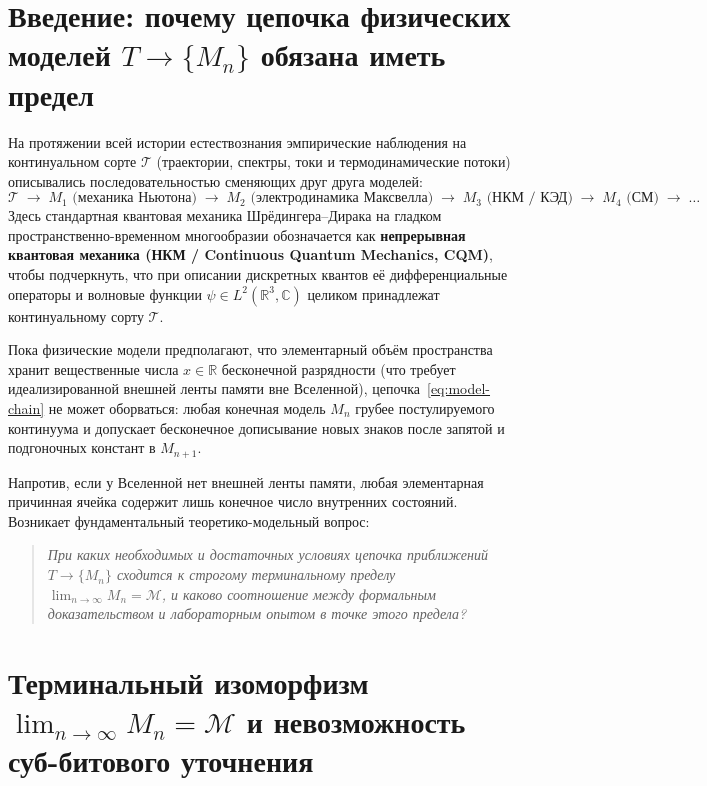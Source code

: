 \documentclass[11pt,a4paper]{article}
\theoremstyle{definition}
\theoremstyle{remark}
\begin{document}
\section{Введение: почему цепочка физических моделей $T \to \{M_n\}$ обязана иметь предел}
\label{sec:intro}

На протяжении всей истории естествознания эмпирические наблюдения на континуальном сорте $\mathcal{T}$ (траектории, спектры, токи и термодинамические потоки) описывались последовательностью сменяющих друг друга моделей:
\begin{equation}
  \label{eq:model-chain}
  \mathcal{T} \;\longrightarrow\; M_1 \text{ (механика Ньютона)} \;\longrightarrow\; M_2 \text{ (электродинамика Максвелла)} \;\longrightarrow\; M_3 \text{ (НКМ / КЭД)} \;\longrightarrow\; M_4 \text{ (СМ)} \;\longrightarrow\; \dots
\end{equation}
Здесь стандартная квантовая механика Шрёдингера--Дирака на гладком пространственно-временном многообразии обозначается как \textbf{непрерывная квантовая механика (НКМ / Continuous Quantum Mechanics, CQM)}, чтобы подчеркнуть, что при описании дискретных квантов её дифференциальные операторы и волновые функции $\psi\in L^2(\mathbb{R}^3,\mathbb{C})$ целиком принадлежат континуальному сорту $\mathcal{T}$.

Пока физические модели предполагают, что элементарный объём пространства хранит вещественные числа $x\in\mathbb{R}$ бесконечной разрядности (что требует идеализированной внешней ленты памяти вне Вселенной), цепочка~\eqref{eq:model-chain} не может оборваться: любая конечная модель $M_n$ грубее постулируемого континуума и допускает бесконечное дописывание новых знаков после запятой и подгоночных констант в $M_{n+1}$.

Напротив, если у Вселенной нет внешней ленты памяти, любая элементарная причинная ячейка содержит лишь конечное число внутренних состояний. Возникает фундаментальный теоретико-модельный вопрос:
\begin{quote}
  \emph{При каких необходимых и достаточных условиях цепочка приближений $T \to \{M_n\}$ сходится к строгому терминальному пределу $\lim_{n\to\infty} M_n = \mathcal{M}$, и каково соотношение между формальным доказательством и лабораторным опытом в точке этого предела?}
\end{quote}

\section{Терминальный изоморфизм $\lim_{n\to\infty} M_n = \mathcal{M}$ и невозможность суб-битового уточнения}
\label{sec:terminal-limit}
\end{document}
